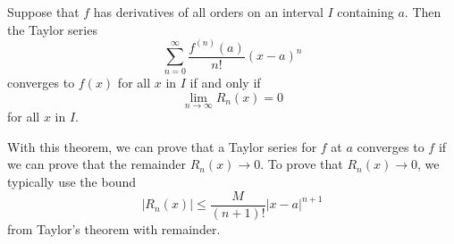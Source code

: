 \documentclass{report}
\begin{document}
    \pagebreak \bigbreak \noindent 
    \begin{thrmm}
        Suppose that $f$ has derivatives of all orders on an interval $I$ containing $a$. Then the Taylor series
        \[
        \sum_{n=0}^{\infty} \frac{f^{(n)}(a)}{n!}(x-a)^n
        \]
        converges to $f(x)$ for all $x$ in $I$ if and only if
        \[
        \lim_{n \to \infty} R_n(x) = 0
        \]
        for all $x$ in $I$.
    \end{thrmm}
    
    \bigbreak \noindent 
    \begin{notebox}
        With this theorem, we can prove that a Taylor series for $f$ at $a$ converges to $f$ if we can prove that the remainder $R_n(x) \to 0$. To prove that $R_n(x) \to 0$, we typically use the bound
        \[
        |R_n(x)| \leq \frac{M}{(n+1)!}|x - a|^{n+1}
        \]
        from Taylor’s theorem with remainder.
    \end{notebox}
\end{document}
